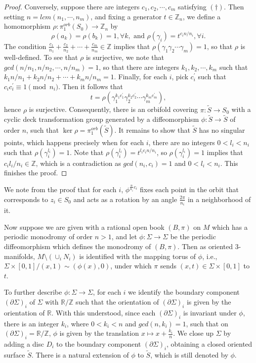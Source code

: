 \documentclass[11pt]{amsart}
\theoremstyle{plain}
\numberwithin{theorem}{section}
\theoremstyle{definition}
\newcommand{\R}{{\mathbb R}}
\newcommand{\Z}{{\mathbb Z}}
\begin{document}
\begin{proof}
Conversely, suppose there are integers $c_1,c_2,\cdots,c_m$ satisfying $(\dag)$. Then setting
$n=lcm(n_1,\cdots,n_m)$, and fixing a generator $t\in \Z_n$, we define a homomorphism
$\rho: \pi_1^{orb}(S_0)\rightarrow\Z_n$ by 
$$
\rho(a_k)=\rho(b_k)=1, \forall k, \mbox{ and } \rho(\gamma_i)=t^{c_in/n_i}, \forall i.
$$
The condition $\frac{c_1}{n_1}+\frac{c_2}{n_2}+\cdots+\frac{c_m}{n_m}\in\Z$ implies that
$\rho(\gamma_1\gamma_2\cdots\gamma_m)=1$, so that $\rho$ is well-defined. To see that
$\rho$ is surjective, we note that $gcd(n/n_1,n/n_2,\cdots,n/n_m)=1$, so that there are integers
$k_1,k_2,\cdots,k_m$ such that $k_1n/n_1+k_2n/n_2+\cdots+k_mn/n_m=1$. Finally, for each $i$,
pick $c_i^\prime$ such that $c_ic_i^\prime\equiv 1 \pmod{n_i}$. Then it follows that
$$
t=\rho(\gamma_1^{k_1c_1^\prime}\gamma_2^{k_2c_2^\prime}\cdots\gamma_m^{k_mc_m^\prime}),
$$
hence $\rho$ is surjective. Consequently, there is an orbifold covering $\pi: \tilde{S}\rightarrow S_0$ with
a cyclic deck transformation group generated by a diffeomorphism $\phi: \tilde{S}\rightarrow \tilde{S}$ of order $n$, such that $\ker\rho=\pi_1^{orb}(\tilde{S})$. It remains to show that $\tilde{S}$ has no singular points, which happens
precisely when for each $i$, there are no integers $0<l_i<n_i$ such that $\rho(\gamma_i^{l_i})=1$. Note
that $\rho(\gamma_i^{l_i})=t^{l_ic_in/n_i}$, so $\rho(\gamma_i^{l_i})=1$ implies that $c_il_i/n_i\in\Z$,
which is a contradiction as $gcd(n_i,c_i)=1$ and $0<l_i<n_i$. This finishes the proof.

\end{proof}

We note from the proof that for each $i$, $\phi^{\frac{n}{n_i}c_i}$ fixes each point in the orbit that corresponds to $z_i\in S_0$ and acts as a rotation by an angle $\frac{2\pi}{n_i}$ in a neighborhood of it. 

\vspace{2mm}


Now suppose we are given with a rational open book $(B,\pi)$ on $M$ which has a periodic monodromy of order $n>1$, and let $\phi:\Sigma\rightarrow\Sigma$ be the periodic diffeomorphism which defines the monodromy of $(B,\pi)$. Then as oriented $3$-manifolds, $M\setminus (\cup_i N_i)$ is identified with the mapping torus of $\phi$, i.e., $\Sigma\times [0,1]/ (x,1)\sim (\phi(x),0)$,  under which $\pi$ sends $(x,t)\in \Sigma\times [0,1]$ to $t$. 

To further describe $\phi:\Sigma\rightarrow\Sigma$, for each $i$ we identify the boundary component 
$(\partial \Sigma)_i$ of $\Sigma$ with $\R/\Z$ such that the orientation of $(\partial \Sigma)_i$ is given by the orientation of $\R$. With this understood, since each $(\partial \Sigma)_i$ is invariant under 
$\phi$, there is an integer $k_i$, where $0<k_i<n$ and $gcd(n,k_i)=1$, such that on 
$(\partial \Sigma)_i=\R/\Z$, $\phi$ is given by the translation $x\mapsto x+\frac{k_i}{n}$. We 
close up $\Sigma$ by adding a disc $D_i$ to the boundary component $(\partial \Sigma)_i$, 
obtaining a closed oriented surface $\tilde{S}$. There is a natural extension of $\phi$ to $\tilde{S}$, which is still denoted by $\phi$. 
\end{document}
